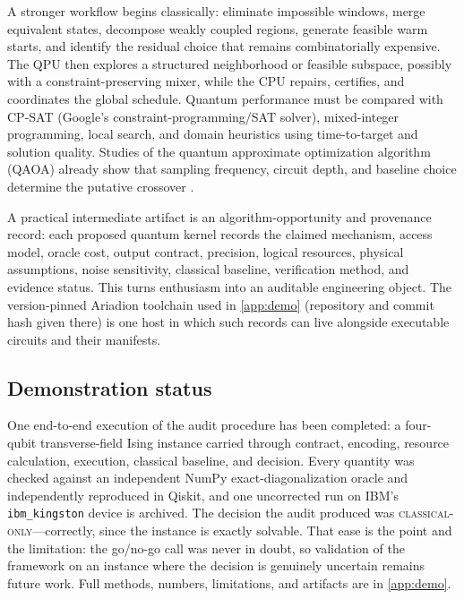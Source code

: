 A stronger workflow begins classically: eliminate impossible windows, merge equivalent states, decompose weakly coupled regions, generate feasible warm starts, and identify the residual choice that remains combinatorially expensive. The QPU then explores a structured neighborhood or feasible subspace, possibly with a constraint-preserving mixer, while the CPU repairs, certifies, and coordinates the global schedule. Quantum performance must be compared with CP-SAT (Google's constraint-programming/SAT solver), mixed-integer programming, local search, and domain heuristics using time-to-target and solution quality. Studies of the quantum approximate optimization algorithm (QAOA) already show that sampling frequency, circuit depth, and baseline choice determine the putative crossover \citep{lykhov2023}.

A practical intermediate artifact is an algorithm-opportunity and provenance record: each proposed quantum kernel records the claimed mechanism, access model, oracle cost, output contract, precision, logical resources, physical assumptions, noise sensitivity, classical baseline, verification method, and evidence status. This turns enthusiasm into an auditable engineering object. The version-pinned Ariadion toolchain used in \cref{app:demo} (repository and commit hash given there) is one host in which such records can live alongside executable circuits and their manifests.

\subsection{Demonstration status}

One end-to-end execution of the audit procedure has been completed: a four-qubit transverse-field Ising instance carried through contract, encoding, resource calculation, execution, classical baseline, and decision. Every quantity was checked against an independent NumPy exact-diagonalization oracle and independently reproduced in Qiskit, and one uncorrected run on IBM's \texttt{ibm\_kingston} device is archived. The decision the audit produced was \textsc{classical-only}---correctly, since the instance is exactly solvable. That ease is the point and the limitation: the go/no-go call was never in doubt, so validation of the framework on an instance where the decision is genuinely uncertain remains future work. Full methods, numbers, limitations, and artifacts are in \cref{app:demo}.
